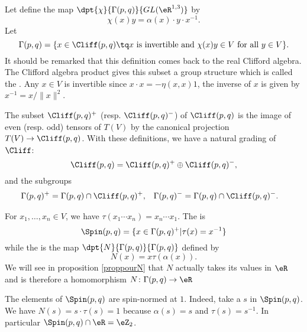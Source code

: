 Let define the map $\dpt{\chi}{\Gamma(p,q)}{GL(\eR^{1,3})}$ by 
\begin{equation}
                \chi(x)y=\alpha(x)\cdot y\cdot x^{-1}.
\end{equation}
Let
\[
 \Gamma(p,q)=\{x\in\Cliff(p,q)\tq\textrm{$x$ is invertible and }  \chi(x)y  \in V\textrm{ for all $y\in V$}\}.
\]
It should be remarked that this definition comes back to the real Clifford algebra. The Clifford algebra product gives this subset a group structure which is called the . Any $x\in V$ is invertible since $x\cdot x=-\eta(x,x)1$, the inverse of $x$ is given by $x^{-1}=x/\|x\|^2$.

The subset $\Cliff(p,q)^+$ (resp. $\Cliff(p,q)^-$) of $\Cliff(p,q)$ is the image of even (resp. odd) tensors of $T(V)$ by the canonical projection $T(V)\to\Cliff(p,q)$. With these definitions, we have a natural grading of $\Cliff$:
\begin{equation}
 \label{directC}\Cliff(p,q)=\Cliff(p,q)^+\oplus\Cliff(p,q)^-,
 \end{equation}
and the subgroups
\begin{align}
\label{defgplus}
\Gamma(p,q)^+&=\Gamma(p,q)\cap\Cliff(p,q)^+,&\Gamma(p,q)^-&=\Gamma(p,q)\cap\Cliff(p,q)^-.
\end{align}

For $x_1,\ldots,x_n\in V$, we have $\tau(x_1\cdots x_n)=x_n\cdots x_1$.  The  is
\begin{equation}   \label{defSpinun}
 \Spin(p,q)=\{x\in\Gamma(p,q)^+\vert\tau(x)=x^{-1}\}
\end{equation}
while the  is the map $\dpt{N}{\Gamma(p,q)}{\Gamma(p,q)}$ defined by
\[
 N(x)=x\tau(\alpha(x)).
\]
We will see in proposition \ref{proppourN} that $N$  actually takes its values in $\eR$ and is therefore a homomorphism $N\colon \Gamma(p,q)\to \eR$

\begin{remark}
The elements of $\Spin(p,q)$ are spin-normed at $1$. Indeed, take a $s$ in $\Spin(p,q)$. We have $N(s)=s\cdot \tau(s)=1$ because $\alpha(s)=s$ and $\tau(s)=s^{-1}$. In particular $\Spin(p,q)\cap\eR=\eZ_{2}$.
\label{rem:spin_norm_u}
\end{remark}

